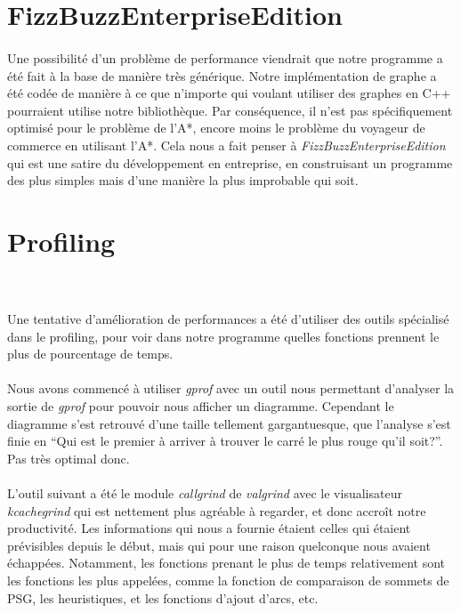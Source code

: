 \documentclass[french]{article}
\begin{document}
\section{FizzBuzzEnterpriseEdition}

\paragraph{} Une possibilité d'un problème de performance viendrait que notre
programme a été fait à la base de manière très générique. Notre implémentation
de graphe a été codée de manière à ce que n'importe qui voulant utiliser des
graphes en C++ pourraient utilise notre bibliothèque. Par conséquence, il n'est
pas spécifiquement optimisé pour le problème de l'A*, encore moins le problème
du voyageur de commerce en utilisant l'A*. Cela nous a fait penser à
\emph{FizzBuzzEnterpriseEdition}~\cite{fun:fizzbuzz} qui est une satire du
développement en entreprise, en construisant un programme des plus simples mais
d'une manière la plus improbable qui soit.

\section{Profiling}~\label{sec:prof}

\paragraph{} Une tentative d'amélioration de performances a été d'utiliser des
outils spécialisé dans le profiling, pour voir dans notre programme quelles
fonctions prennent le plus de pourcentage de temps.

\paragraph{} Nous avons commencé à utiliser \emph{gprof} avec un outil nous
permettant d'analyser la sortie de \emph{gprof} pour pouvoir nous afficher un
diagramme. Cependant le diagramme s'est retrouvé d'une taille tellement
gargantuesque, que l'analyse s'est finie en ``Qui est le premier à arriver à
trouver le carré le plus rouge qu'il soit?''. Pas très optimal donc.

\paragraph{} L'outil suivant a été le module \emph{callgrind} de
\emph{valgrind} avec le visualisateur \emph{kcachegrind} qui est nettement plus
agréable à regarder, et donc accroît notre productivité. Les informations qui
nous a fournie étaient celles qui étaient prévisibles depuis le début, mais qui
pour une raison quelconque nous avaient échappées. Notamment, les fonctions
prenant le plus de temps relativement sont les fonctions les plus appelées,
comme la fonction de comparaison de sommets de PSG, les heuristiques, et les
fonctions d'ajout d'arcs, etc.
\end{document}
